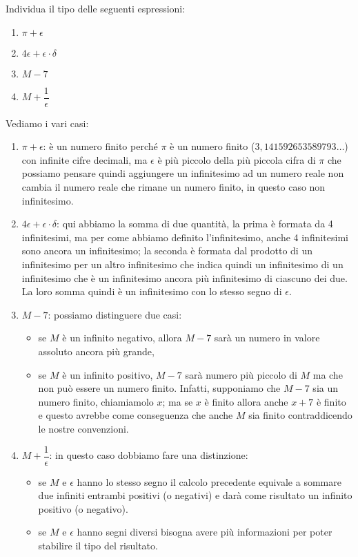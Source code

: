 \newpage %

\begin{esempio}
 Individua il tipo delle seguenti espressioni:

\begin{multicols}{4}
\begin{enumerate} [nosep]
 \item \(\pi+\epsilon\)
 \item \(4\epsilon+\epsilon \cdot \delta\)
 \item \(M-7\)
 \item \(M+\dfrac{1}{\epsilon}\)
\end{enumerate}
\end{multicols}

Vediamo i vari casi:

\begin{enumerate}
 \item \(\pi+\epsilon\): 
è un numero finito perché \(\pi\) è un numero 
finito (\(3,141592653589793\dots\)) con infinite cifre decimali, ma 
\(\epsilon\) è più piccolo della più piccola cifra di \(\pi\) che possiamo 
pensare quindi aggiungere un infinitesimo ad un numero reale non cambia il 
numero reale che rimane un numero finito, in questo caso non infinitesimo.
 \item  \(4\epsilon+\epsilon \cdot \delta\): 
qui abbiamo la somma di due quantità, 
la prima è formata da 4 infinitesimi, ma per come abbiamo definito 
l'infinitesimo, anche 4 infinitesimi sono ancora un infinitesimo; la 
seconda è formata dal prodotto di un infinitesimo per un altro infinitesimo 
che indica quindi un infinitesimo di un infinitesimo che è un infinitesimo 
ancora più infinitesimo di ciascuno dei due. La loro somma quindi è un 
infinitesimo con lo stesso segno di \(\epsilon\).
 \item \(M-7\):
possiamo distinguere due casi: 
 \begin{itemize} [noitemsep]
  \item se \(M\) è un infinito negativo, allora 
\(M-7\) sarà un numero in valore assoluto ancora più grande, 
 \item se \(M\) è un infinito positivo, \(M-7\) sarà numero più piccolo di 
\(M\) ma che non può essere un numero finito. 
Infatti, supponiamo che \(M-7\) sia un numero finito, chiamiamolo \(x\); ma 
se \(x\) è finito allora anche \(x+7\) è finito e questo avrebbe come 
conseguenza che anche \(M\) sia finito contraddicendo le nostre convenzioni.
 \end{itemize}
 \item \(M+\dfrac{1}{\epsilon}\):
 in questo caso dobbiamo fare una distinzione:
 \begin{itemize} [noitemsep]
  \item se \(M\) e \(\epsilon\) hanno lo stesso segno il calcolo precedente 
equivale a sommare due infiniti entrambi positivi (o negativi) e darà come 
risultato un infinito positivo (o negativo).
  \item se \(M\) e \(\epsilon\) hanno segni diversi bisogna avere più 
informazioni per poter stabilire il tipo del risultato.
 \end{itemize}


\end{enumerate}
\end{esempio}
